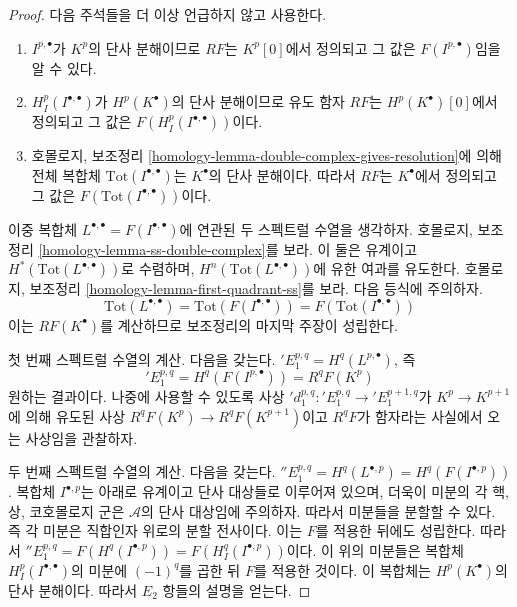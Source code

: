 \begin{proof}
다음 주석들을 더 이상 언급하지 않고 사용한다.
\begin{enumerate}
\item $I^{p, \bullet}$가 $K^p$의 단사 분해이므로
$RF$는 $K^p[0]$에서 정의되고 그 값은 $F(I^{p, \bullet})$임을 알 수 있다.
\item $H^p_I(I^{\bullet, \bullet})$가 $H^p(K^\bullet)$의 단사 분해이므로
유도 함자 $RF$는 $H^p(K^\bullet)[0]$에서 정의되고 그 값은
$F(H^p_I(I^{\bullet, \bullet}))$이다.
\item 호몰로지, 보조정리
\ref{homology-lemma-double-complex-gives-resolution}에 의해 전체 복합체
$\text{Tot}(I^{\bullet, \bullet})$는 $K^\bullet$의 단사 분해이다.
따라서 $RF$는 $K^\bullet$에서 정의되고 그 값은
$F(\text{Tot}(I^{\bullet, \bullet}))$이다.
\end{enumerate}
이중 복합체
$L^{\bullet, \bullet} = F(I^{\bullet, \bullet})$에 연관된 두 스펙트럴
수열을 생각하자. 호몰로지, 보조정리
\ref{homology-lemma-ss-double-complex}를 보라.
이 둘은 유계이고 $H^*(\text{Tot}(L^{\bullet, \bullet}))$로
수렴하며, $H^n(\text{Tot}(L^{\bullet, \bullet}))$에 유한 여과를 유도한다.
호몰로지, 보조정리 \ref{homology-lemma-first-quadrant-ss}를 보라.
다음 등식에 주의하자.
$$
\text{Tot}(L^{\bullet, \bullet}) =
\text{Tot}(F(I^{\bullet, \bullet})) =
F(\text{Tot}(I^{\bullet, \bullet}))
$$
이는 $RF(K^\bullet)$를 계산하므로 보조정리의 마지막 주장이 성립한다.

\medskip\noindent
첫 번째 스펙트럴 수열의 계산. 다음을 갖는다.
$ {}'E_1^{p, q} = H^q(L^{p, \bullet})$, 즉
$$
{}'E_1^{p, q} = H^q(F(I^{p, \bullet})) = R^qF(K^p)
$$
원하는 결과이다. 나중에 사용할 수 있도록 사상
$ {}'d_1^{p, q} : {}'E_1^{p, q} \to {}'E_1^{p + 1, q}$가
$K^p \to K^{p + 1}$에 의해 유도된 사상
$R^qF(K^p) \to R^qF(K^{p + 1})$이고 $R^qF$가 함자라는 사실에서
오는 사상임을 관찰하자.

\medskip\noindent
두 번째 스펙트럴 수열의 계산. 다음을 갖는다.
$ {}''E_1^{p, q} = H^q(L^{\bullet, p}) = H^q(F(I^{\bullet, p}))$.
복합체 $I^{\bullet, p}$는 아래로 유계이고 단사 대상들로 이루어져 있으며,
더욱이 미분의 각 핵, 상, 코호몰로지 군은 $\mathcal{A}$의 단사 대상임에
주의하자. 따라서 미분들을 분할할 수 있다. 즉 각 미분은 직합인자 위로의
분할 전사이다.
이는 $F$를 적용한 뒤에도 성립한다. 따라서
$ {}''E_1^{p, q} = F(H^q(I^{\bullet, p})) =
F(H^q_I(I^{\bullet, p}))$이다.
이 위의 미분들은 복합체
$H^p_I(I^{\bullet, \bullet})$의 미분에 $(-1)^q$를 곱한 뒤 $F$를
적용한 것이다. 이 복합체는 $H^p(K^\bullet)$의 단사 분해이다.
따라서 $E_2$ 항들의 설명을 얻는다.
\end{proof}

